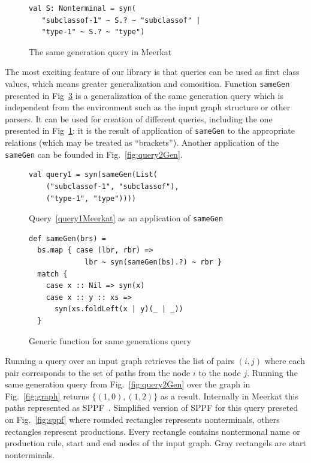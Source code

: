 \begin{figure}[h]
\begin{lstlisting}
val S: Nonterminal = syn(
   "subclassof-1" ~ S.? ~ "subclassof" |
   "type-1" ~ S.? ~ "type")
\end{lstlisting}
\caption{The same generation query in Meerkat}
\label{fig:query1Meerkat}
\end{figure}


The most exciting feature of our library is that queries can be used as first class values, which means greater generalization and comosition. 
Function \lstinline{sameGen} presented in Fig~\ref{fig:gen} is a generalization of the same generation query which is independent from the environment such as the input graph structure or other parsers.
It can be used for creation of different queries, including the one presented in Fig~\ref{fig:query1Meerkat}: it is the result of application of \lstinline{sameGen} to the appropriate relations (which may be treated  as ``brackets'').
Another application of the \lstinline{sameGen} can be founded in Fig.~\ref{fig:query2Gen}.

\begin{figure}[h]
\begin{lstlisting}
val query1 = syn(sameGen(List(
    ("subclassof-1", "subclassof"),
    ("type-1", "type"))))
\end{lstlisting}
\caption{Query~\ref{query1Meerkat} as an application of \lstinline{sameGen}}
\label{fig:query1Gen}
\end{figure}

\begin{figure}[h]
\begin{lstlisting}
def sameGen(brs) =
  bs.map { case (lbr, rbr) => 
             lbr ~ syn(sameGen(bs).?) ~ rbr } 
  match {
    case x :: Nil => syn(x)
    case x :: y :: xs => 
      syn(xs.foldLeft(x | y)(_ | _))
  }
\end{lstlisting}
\caption{Generic function for same generations query}
\label{fig:gen}
\end{figure}

Running a query over an input graph retrieves the list of pairs $(i, j)$ where each pair corresponds to the set of paths from the node $i$ to the node $j$. 
Running the same generation query from Fig.~\ref{fig:query2Gen} over the graph in Fig.~\ref{fig:graph} returns  $\{(1,0), (1,2)\}$ as a result. 
Internally in Meerkat this paths represented as SPPF~\cite{SPPF}. 
Simplified version of SPPF for this query preseted on Fig.~\ref{fig:sppf} where rounded rectangles represents nonterminals, others rectangles represent productions. 
Every rectangle contains  nontermonal name or production rule, start and end nodes of thr input graph. 
Gray rectangels are start nonterminals.

